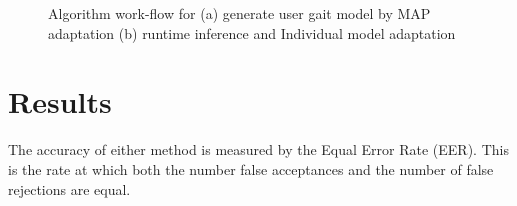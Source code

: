 \documentclass{sig-alternate}
\begin{document}
	

\begin{figure}
\centering
{}
\caption{Algorithm work-flow for (a) generate user gait model by MAP adaptation (b) runtime inference and Individual model adaptation}
\label{fig:TD2}
\end{figure}




	
\section{Results}
	The accuracy of either method is measured by the Equal Error Rate (EER). This is the rate at which both the number false acceptances and the number of false rejections are equal.
	
\end{document}
